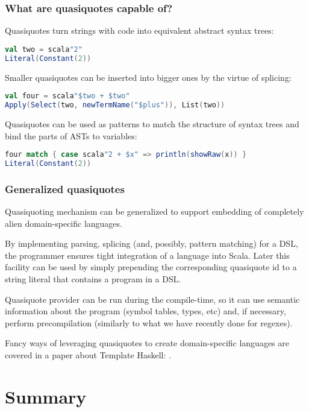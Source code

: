 \documentclass[hyperref={bookmarks=false}]{beamer}
\begin{document}
\begin{frame}[t,fragile]
\frametitle{What are quasiquotes capable of?}

Quasiquotes turn strings with code into equivalent abstract syntax trees:

\begin{lstlisting}[language=scala]
val two = scala"2"
Literal(Constant(2))
\end{lstlisting}

Smaller quasiquotes can be inserted into bigger ones by the virtue of splicing:

\begin{lstlisting}[language=scala]
val four = scala"$two + $two"
Apply(Select(two, newTermName("$plus")), List(two))
\end{lstlisting}%

Quasiquotes can be used as patterns to match the structure of syntax trees and bind the parts of ASTs to variables:

\begin{lstlisting}[language=scala]
four match { case scala"2 + $x" => println(showRaw(x)) }
Literal(Constant(2))
\end{lstlisting}%
\end{frame}

\begin{frame}[t,fragile]
\frametitle{Generalized quasiquotes}
Quasiquoting mechanism can be generalized to support embedding of completely alien domain-specific languages.

By implementing parsing, splicing (and, possibly, pattern matching) for a DSL, the programmer ensures tight integration of a language into Scala. Later this facility can be used by simply prepending the corresponding quasiquote id to a string literal that contains a program in a DSL.

Quasiquote provider can be run during the compile-time, so it can use semantic information about the program (symbol tables, types, etc) and, if necessary, perform precompilation (similarly to what we have recently done for regexes).

Fancy ways of leveraging quasiquotes to create domain-specific languages are covered in a paper about Template Haskell: .

\end{frame}

\section{Summary}
\end{document}
